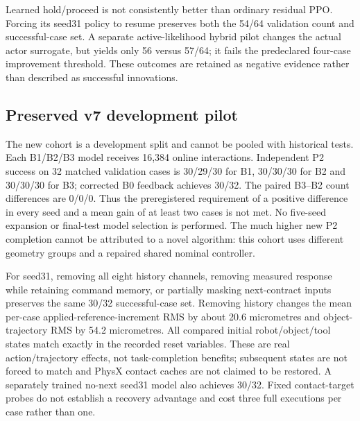 Learned hold/proceed is not consistently better than ordinary residual PPO. Forcing its seed31 policy to resume preserves both the 54/64 validation count and successful-case set. A separate active-likelihood hybrid pilot changes the actual actor surrogate, but yields only 56 versus 57/64; it fails the predeclared four-case improvement threshold. These outcomes are retained as negative evidence rather than described as successful innovations.

\subsection{Preserved v7 development pilot}
\begin{table}[t]\centering\small
\caption{Preserved v7 P2 development pilot from actual run records, not the subsequent R1--R3 task versions. Reported successes are independently accepted. Interactions denotes the underlying policy's training budget: inference interventions do not incur that training budget again. Nonlearning probes have zero training, not zero physical evaluation cost.}\label{tab:pilot}

\end{table}
\begin{table}[t]\centering\small
\caption{Mechanism interventions and resource accounting generated from the actual pilot evidence. An input or action effect is not by itself evidence of improved completion.}\label{tab:ablation}
\resizebox{\textwidth}{!}{}
\end{table}
The new cohort is a development split and cannot be pooled with historical tests. Each B1/B2/B3 model receives 16,384 online interactions. Independent P2 success on 32 matched validation cases is 30/29/30 for B1, 30/30/30 for B2 and 30/30/30 for B3; corrected B0 feedback achieves 30/32. The paired B3--B2 count differences are 0/0/0. Thus the preregistered requirement of a positive difference in every seed and a mean gain of at least two cases is not met. No five-seed expansion or final-test model selection is performed. The much higher new P2 completion cannot be attributed to a novel algorithm: this cohort uses different geometry groups and a repaired shared nominal controller.

For seed31, removing all eight history channels, removing measured response while retaining command memory, or partially masking next-contract inputs preserves the same 30/32 successful-case set. Removing history changes the mean per-case applied-reference-increment RMS by about 20.6 micrometres and object-trajectory RMS by 54.2 micrometres. All compared initial robot/object/tool states match exactly in the recorded reset variables. These are real action/trajectory effects, not task-completion benefits; subsequent states are not forced to match and PhysX contact caches are not claimed to be restored. A separately trained no-next seed31 model also achieves 30/32. Fixed contact-target probes do not establish a recovery advantage and cost three full executions per case rather than one.

